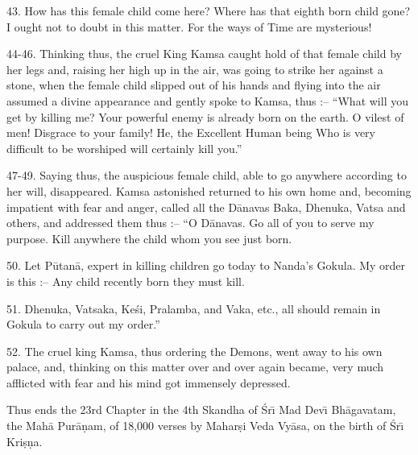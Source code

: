 43. How has this female child come here? Where has that eighth born child gone? I ought not to doubt in this matter. For the ways of Time are mysterious!

44-46. Thinking thus, the cruel King Kamsa caught hold of that female child by her legs and, raising her high up in the air, was going to strike her against a stone, when the female child slipped out of his hands and flying into the air assumed a divine appearance and gently spoke to Kamsa, thus :-- ``What will you get by killing me? Your powerful enemy is already born on the earth. O vilest of men! Disgrace to your family! He, the Excellent Human being Who is very difficult to be worshiped will certainly kill you.''

47-49. Saying thus, the auspicious female child, able to go anywhere according to her will, disappeared. Kamsa astonished returned to his own home and, becoming impatient with fear and anger, called all the D\=anavas Baka, Dhenuka, Vatsa and others, and addressed them thus :-- ``O D\=anavas. Go all of you to serve my purpose. Kill anywhere the child whom you see just born.

50. Let P\=utan\=a, expert in killing children go today to Nanda's Gokula. My order is this :-- Any child recently born they must kill.

51. Dhenuka, Vatsaka, Ke\'si, Pralamba, and Vaka, etc., all should remain in Gokula to carry out my order.''

52. The cruel king Kamsa, thus ordering the Demons, went away to his own palace, and, thinking on this matter over and over again became, very much afflicted with fear and his mind got immensely depressed.

Thus ends the 23rd Chapter in the 4th Skandha of \'Sr\={\i} Mad Dev\={\i} Bh\=agavatam, the Mah\=a Pur\=a\d{n}am, of 18,000 verses by Mahar\d{s}i Veda Vy\=asa, on the birth of \'Sr\={\i} Kri\d{s}\d{n}a.



